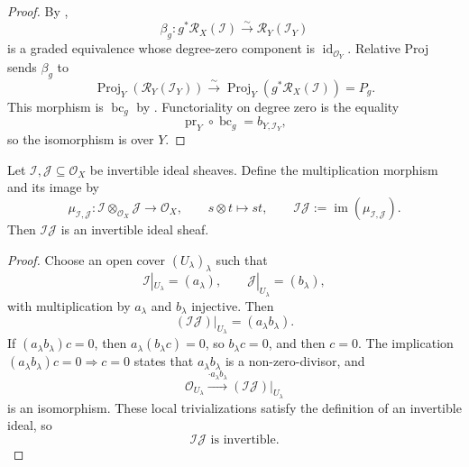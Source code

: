 \begin{proof}
  By ,
  \[
    \beta_g\colon g^*\mathcal R_X(\mathcal I)
      \xrightarrow{\sim}\mathcal R_Y(\mathcal I_Y)
  \]
  is a graded equivalence whose degree-zero component is
  $\operatorname{id}_{\mathcal O_Y}$.  Relative Proj sends $\beta_g$ to
  \[
    \operatorname{Proj}_Y(\mathcal R_Y(\mathcal I_Y))
      \xrightarrow{\sim}
    \operatorname{Proj}_Y(g^*\mathcal R_X(\mathcal I))
      =P_g.
  \]
  This morphism is $\operatorname{bc}_g$ by
  .  Functoriality on degree zero
  is the equality
  \[
    \operatorname{pr}_Y\circ\operatorname{bc}_g
      =b_{Y,\mathcal I_Y},
  \]
  so the isomorphism is over $Y$.
\end{proof}

\begin{lemma}
  \label{lemma:nagata-invertible-ideal-mul}

  Let $\mathcal I,\mathcal J\subseteq\mathcal O_X$ be invertible ideal
  sheaves.  Define the multiplication morphism and its image by
  \[
    \mu_{\mathcal I,\mathcal J}\colon
      \mathcal I\otimes_{\mathcal O_X}\mathcal J
        \longrightarrow\mathcal O_X,
    \qquad s\otimes t\longmapsto st,
    \qquad
    \mathcal I\mathcal J:=
      \operatorname{im}(\mu_{\mathcal I,\mathcal J}).
  \]
  Then $\mathcal I\mathcal J$ is an invertible ideal sheaf.
\end{lemma}

\begin{proof}
  Choose an open cover $(U_\lambda)_\lambda$ such that
  \[
    \mathcal I|_{U_\lambda}=(a_\lambda),\qquad
    \mathcal J|_{U_\lambda}=(b_\lambda),
  \]
  with multiplication by $a_\lambda$ and $b_\lambda$ injective.  Then
  \[
    (\mathcal I\mathcal J)|_{U_\lambda}=(a_\lambda b_\lambda).
  \]
  If $(a_\lambda b_\lambda)c=0$, then
  $a_\lambda(b_\lambda c)=0$, so $b_\lambda c=0$, and then $c=0$.
  The implication
  $(a_\lambda b_\lambda)c=0\Rightarrow c=0$ states that
  $a_\lambda b_\lambda$ is a non-zero-divisor, and
  \[
    \mathcal O_{U_\lambda}\xrightarrow{\cdot a_\lambda b_\lambda}
      (\mathcal I\mathcal J)|_{U_\lambda}
  \]
  is an isomorphism.  These local trivializations satisfy the definition of
  an invertible ideal, so
  \[
    \mathcal I\mathcal J\text{ is invertible}.
  \]
\end{proof}

